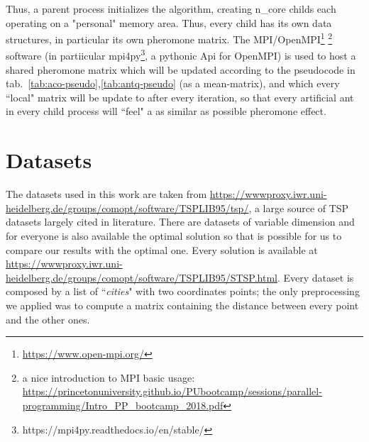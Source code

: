 Thus, a parent process initializes the algorithm, creating n\_core childs each operating on a "personal" memory area. 
Thus, every child has its own data structures, in particular its own pheromone matrix. 
The MPI/OpenMPI\footnote{\url{https://www.open-mpi.org/}} \footnote{a nice introduction to MPI basic usage: \url{https://princetonuniversity.github.io/PUbootcamp/sessions/parallel-programming/Intro_PP_bootcamp_2018.pdf}} software (in partiicular mpi4py\footnote{https://mpi4py.readthedocs.io/en/stable/}, a pythonic Api for OpenMPI) is used to host a shared pheromone matrix which will be updated according to the pseudocode in tab.~\ref{tab:aco-pseudo},\ref{tab:antq-pseudo} (as a mean-matrix), and which every ``local" matrix will be update to after every iteration, so that every artificial ant in every child process will ``feel" a as similar as possible pheromone effect.


\section{Datasets}
The datasets used in this work are taken from  \url{https://wwwproxy.iwr.uni-heidelberg.de/groups/comopt/software/TSPLIB95/tsp/}, a large source of TSP datasets largely cited in literature. 
There are datasets of variable dimension and for everyone is also available the optimal solution so that is possible for us to compare our results with the optimal one. 
Every solution is available at \url{https://wwwproxy.iwr.uni-heidelberg.de/groups/comopt/software/TSPLIB95/STSP.html}. Every dataset is composed by a list of ``\textit{cities}" with two coordinates points; the only preprocessing we applied was to compute a matrix containing the distance between every point and the other ones.
